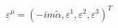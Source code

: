 \begin{equation}
\varepsilon^{\mu} = (-i m \tilde{\alpha}, \varepsilon^1, \varepsilon^2, \varepsilon^3)^T
\label{61}
\end{equation}

